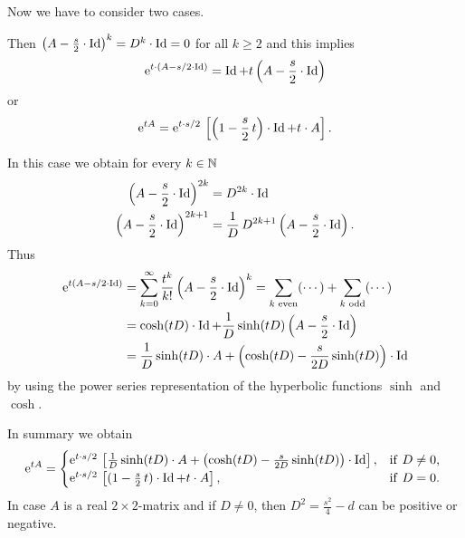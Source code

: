 Now we have to consider two cases.
\begin{description}[wide, labelindent=0em]

\item[$ D^{2} = 0 $: ] 
Then $\left( A - \frac{s}{2}  \cdot \operatorname{Id} \right)^{k} = D^{k} \cdot \operatorname{Id} = 0 $  for all $ k \geq 2 $ and this implies 
%
\[
	  \mathrm{e}^{t \cdot \left( A - s/2  \cdot \operatorname{Id} \right)} = \operatorname{Id} + t \left(  A - \frac{s}{2}  \cdot \operatorname{Id} \right)
\]
%
or
%
\[
	 \mathrm{e}^{t A } =  \mathrm{e}^{t\cdot s/2} \, \left[ \left( 1 - \frac{s}{2} \, t \right )\cdot \operatorname{Id} + t \cdot A \right] .
\]
%
\item[$ D^{2} \neq 0 $: ]
In this case we obtain for every $ k \in \mathbb{N} $
%
\begin{align*}
	\left( A - \frac{s}{2} \cdot \operatorname{Id} \right)^{2k}  &= D^{2k} \cdot \operatorname{Id} \\ 
	\left( A - \frac{s}{2}  \cdot \operatorname{Id} \right)^{2k+1} &=\frac{1}{D} \, D^{2k+1}\left( A - \frac{s}{2} \cdot \operatorname{Id} \right) .
\end{align*}
Thus 
\begin{align*}
	 \mathrm{e}^{t( A - s/2  \cdot \operatorname{Id} )} 
		& = \sum_{k=0}^\infty \frac{t^k}{k!}\left( A - \frac{s}{2}  \cdot \operatorname{Id} \right)^k 
		= \sum_{k \text{ even}} (\cdots) + \sum_{k \text{ odd}} (\cdots)  \\
	&= \cosh( t D ) \cdot \operatorname{Id} + \frac{1}{D} \sinh( t D ) \left( A - \frac{s}{2}  \cdot \operatorname{Id} \right) \\
	&= \frac{ 1 }{ D } \sinh( tD )\cdot A + \left( \cosh(tD) - \frac{s}{2D} \sinh(tD) \right) \cdot \operatorname{Id}
\end{align*}
by using the power series representation of the hyperbolic functions $ \sinh $ and $ \cosh $.
\end{description}
In summary we obtain
\begin{equation*}\label{eq:exp-rep}
	 \mathrm{e}^{tA} =
	\begin{cases}
		 \mathrm{e}^{t \cdot s/2} \, \left[ \frac{1}{D} \sinh(t D)  \cdot A + 
			\left( \cosh(tD) - \frac{s}{2D} \sinh(tD) \right) \cdot \operatorname{Id} \right], & 
									\text{if\/ $ D \neq 0 $, } \\
		 \mathrm{e}^{t \cdot s/2} \, \left[ ( 1 - \frac{s}{2} \, t )\cdot \operatorname{Id} + t \cdot A \right], &
									\text{if\/ $ D = 0 $.}
	\end{cases}
\end{equation*}
In case $A$ is a real $2 \times2$-matrix and if\/ $ D \neq 0 $, then 
$ D^{2} = \frac{s^{2}}{4} - d $ can be positive or negative. 
